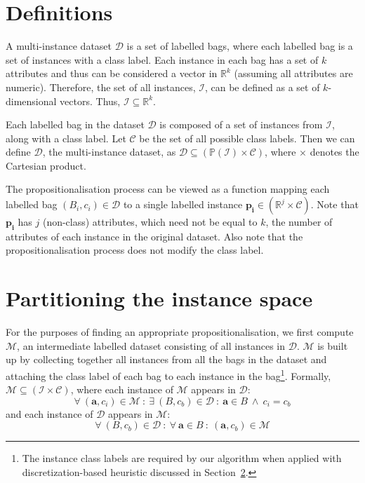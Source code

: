 \documentclass[a4paper,12pt]{report} %
\newcommand{\real}{\mathbb{R}}
\newcommand{\mcl}[1]{\mathcal{#1}}
\newcommand{\power}{\mathbb{P}}
\newcommand{\vect}[1]{\boldsymbol{#1}}
\begin{document}
\section{Definitions}
\label{sec:method:defn}

A multi-instance dataset $\mcl{D}$ is a set of labelled bags, 
    where each labelled bag is a set of instances with a class label.
Each instance in each bag has a set of $k$ attributes
    and thus can be considered a vector in $\real^k$
    (assuming all attributes are numeric).
Therefore, the set of all instances, $\mcl{I}$,
    can be defined as a set of $k$-dimensional vectors.
Thus, $ \mcl{I} \subseteq \real^k $.

Each labelled bag in the dataset $\mcl{D}$ is 
    composed of a set of instances from $\mcl{I}$,
    along with a class label. %
Let $\mcl{C}$ be the set of all possible class labels.
Then we can define $\mcl{D}$,
    the multi-instance dataset, as 
    $\mcl{D} \subseteq ( \power (\mcl{I}) \times \mcl{C} )$,
    where $\times$ denotes the Cartesian product.

The propositionalisation process can be viewed as a function
    mapping each labelled bag $({B_i},c_i) \in \mcl{D}$ to 
    a single labelled instance $\vect{p_i} \in ( \real^j \times \mcl{C} )$.
Note that $\vect{p_i}$ has $j$ (non-class) attributes, 
    which need not be equal to $k$, the number of attributes of 
    each instance in the original dataset.
Also note that the propositionalisation process 
    does not modify the class label.
       

\section{Partitioning the instance space}
\label{sec:method:partition}

For the purposes of finding an appropriate propositionalisation,
    we first compute $\mcl{M}$, an intermediate labelled dataset 
    consisting of all instances in $\mcl{D}$.
$\mcl{M}$ is built up by collecting together all instances
    from all the bags in the dataset and 
    attaching the class label of each bag to 
    each instance in the bag\footnote{The 
    	instance class labels are required by our algorithm
    	when applied with discretization-based heuristic discussed
    	in Section~\ref{sec:method:partition}.}.
Formally, $\mcl{M} \subseteq (\mcl{I} \times \mcl{C})$, 
    where each instance of $\mcl{M}$ appears in $\mcl{D}$:
    $$
        \forall~(\vect{a},c_i)\in\mcl{M} ~:~ 
            \exists~({B},c_b) \in \mcl{D} ~:~ 
                \vect{a} \in {B} ~\land~ c_i = c_b
    $$
    and each instance of $\mcl{D}$ appears in $\mcl{M}$:
    $$
        \forall~({B},c_b) \in \mcl{D} ~:~ 
            \forall~\vect{a} \in {B} ~:~
                (\vect{a},c_b) \in \mcl{M}
    $$    
\end{document}
